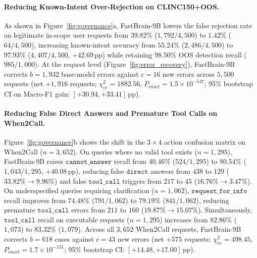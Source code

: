 \documentclass[10pt,twocolumn]{article}
\begin{document}
\paragraph{Reducing Known-Intent Over-Rejection on CLINC150+OOS.}
As shown in Figure~\ref{fig:governance}a, FastBrain-9B lowers the false rejection rate on legitimate in-scope user requests from $39.82\%$ ($1{,}792/4{,}500$) to $1.42\%$ ($64/4{,}500$), increasing known-intent accuracy from $55.24\%$ ($2{,}486/4{,}500$) to $97.93\%$ ($4{,}407/4{,}500$, $+42.69$\,pp) while retaining $98.50\%$ OOS detection recall ($985/1{,}000$). At the request level (Figure~\ref{fig:error_recovery}), FastBrain-9B corrects $b = 1{,}932$ base-model errors against $c = 16$ new errors across $5{,}500$ requests (net $+1{,}916$ requests; $\chi^2_{\text{cc}} = 1882.56$, $P_{\text{exact}} = 1.5 \times 10^{-547}$; 95\% bootstrap CI on Macro-F1 gain: $[+30.94, +33.41]$\,pp).

\paragraph{Reducing False Direct Answers and Premature Tool Calls on When2Call.}
Figure~\ref{fig:governance}b shows the shift in the $3 \times 4$ action confusion matrix on When2Call ($n = 3{,}652$). On queries where no valid tool exists ($n = 1{,}295$), FastBrain-9B raises $\texttt{cannot\_answer}$ recall from $40.46\%$ ($524/1{,}295$) to $80.54\%$ ($1{,}043/1{,}295$, $+40.08$\,pp), reducing false $\texttt{direct}$ answers from $438$ to $129$ ($33.82\% \to 9.96\%$) and false $\texttt{tool\_call}$ triggers from $217$ to $45$ ($16.76\% \to 3.47\%$). On underspecified queries requiring clarification ($n = 1{,}062$), $\texttt{request\_for\_info}$ recall improves from $74.48\%$ ($791/1{,}062$) to $79.19\%$ ($841/1{,}062$), reducing premature $\texttt{tool\_call}$ errors from $211$ to $160$ ($19.87\% \to 15.07\%$). Simultaneously, $\texttt{tool\_call}$ recall on executable requests ($n = 1{,}295$) increases from $82.86\%$ ($1{,}073$) to $83.32\%$ ($1{,}079$). Across all $3{,}652$ When2Call requests, FastBrain-9B corrects $b = 618$ cases against $c = 43$ new errors (net $+575$ requests; $\chi^2_{\text{cc}} = 498.45$, $P_{\text{exact}} = 1.7 \times 10^{-131}$; 95\% bootstrap CI: $[+14.48, +17.00]$\,pp).
\end{document}
